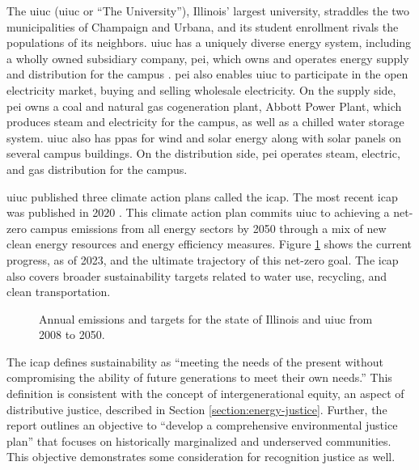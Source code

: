 The \acl{uiuc} (\acs{uiuc} or ``The University''), Illinois' largest university,
straddles the two municipalities of Champaign and Urbana, and its student
enrollment rivals the populations of its neighbors. \ac{uiuc} has a uniquely
diverse energy system, including a wholly owned subsidiary company, \ac{pei},
which owns and operates energy supply and distribution for the campus
\cite{affiliated_engineers_inc_utilities_2015}. \ac{pei} also enables \ac{uiuc}
to participate in the open electricity market, buying and selling wholesale
electricity. On the supply side, \ac{pei} owns a coal and natural gas
cogeneration plant, Abbott Power Plant, which produces steam and electricity for
the campus, as well as a chilled water storage system. \ac{uiuc} also has
\acp{ppa} for wind \cite{breitweiser_wind_2016} and solar energy
\cite{white_solar_2017, white_solar_2020} along with solar panels on several
campus buildings. On the distribution side, \ac{pei} operates steam, electric,
and gas distribution for the campus. 

\ac{uiuc} published three climate action plans called the \acf{icap}. The most recent
\ac{icap} was published in 2020
\cite{institute_for_sustainability_energy_and_environment_illinois_2020}. This
climate action plan commits \ac{uiuc} to achieving a net-zero campus emissions
from all energy sectors by 2050 through a mix of new clean energy resources and
energy efficiency measures. Figure \ref{fig:uiuc-emissions} shows the current
progress, as of 2023, and the ultimate trajectory of this net-zero goal. The
\ac{icap} also covers broader sustainability targets related to water use,
recycling, and clean transportation. 
\begin{figure}[ht!]
    \centering
    \resizebox{0.75\columnwidth}{!}{}
    \caption{Annual emissions and targets for the state of Illinois and
    \ac{uiuc} from 2008 to 2050.}
    \label{fig:uiuc-emissions}
\end{figure}
The \ac{icap} defines sustainability as ``meeting the needs of the present
without compromising the ability of future generations to meet their own
needs.'' This definition is consistent with the concept of intergenerational
equity, an aspect of distributive justice, described in Section
\ref{section:energy-justice}. Further, the report outlines an objective to
``develop a comprehensive environmental justice plan'' that focuses on
historically marginalized and underserved communities. This objective
demonstrates some consideration for recognition justice as well.

